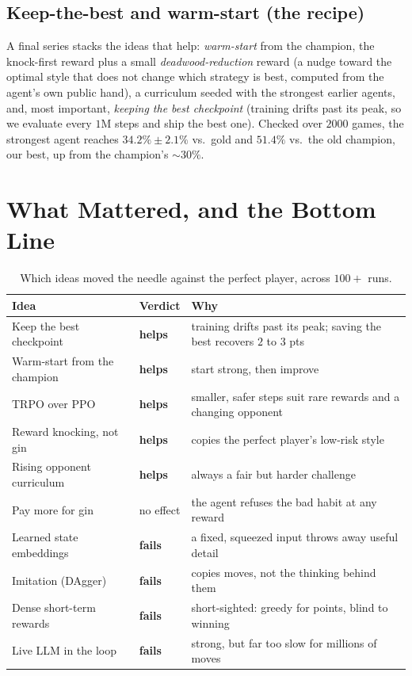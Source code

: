 \documentclass[10pt]{article}
\newcommand{\yes}{\textcolor{good}{\textbf{helps}}}
\newcommand{\no}{\textcolor{bad}{\textbf{fails}}}
\begin{document}
\subsection{Keep-the-best and warm-start (the recipe)}
A final series stacks the ideas that help: \emph{warm-start} from the champion, the knock-first reward
plus a small \emph{deadwood-reduction} reward (a nudge toward the optimal style that does not change
which strategy is best, computed from the agent's own public hand), a curriculum seeded with the
strongest earlier agents, and, most important, \emph{keeping the best checkpoint} (training drifts past
its peak, so we evaluate every $1$M steps and ship the best one). Checked over $2000$ games, the
strongest agent reaches $\mathbf{34.2\% \pm 2.1\%}$ vs.\ gold and $51.4\%$ vs.\ the old champion, our
best, up from the champion's $\sim\!30\%$.

\section{What Mattered, and the Bottom Line}
\begin{table}[h]\centering\footnotesize
\begin{tabular}{@{}llp{8.2cm}@{}}\toprule
Idea & Verdict & Why \\\midrule
Keep the best checkpoint & \yes & training drifts past its peak; saving the best recovers $2$ to $3$ pts \\
Warm-start from the champion & \yes & start strong, then improve \\
TRPO over PPO & \yes & smaller, safer steps suit rare rewards and a changing opponent \\
Reward knocking, not gin & \yes & copies the perfect player's low-risk style \\
Rising opponent curriculum & \yes & always a fair but harder challenge \\
Pay more for gin & \textcolor{bad}{no effect} & the agent refuses the bad habit at any reward \\
Learned state embeddings & \no & a fixed, squeezed input throws away useful detail \\
Imitation (DAgger) & \no & copies moves, not the thinking behind them \\
Dense short-term rewards & \no & short-sighted: greedy for points, blind to winning \\
Live LLM in the loop & \no & strong, but far too slow for millions of moves \\
\bottomrule\end{tabular}
\caption{Which ideas moved the needle against the perfect player, across $100+$ runs.}
\label{tab:levers}
\end{table}
\end{document}
